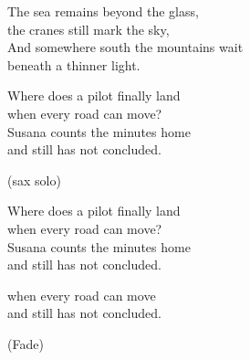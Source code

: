\begin{lyrics}
The sea remains beyond the glass,\\
the cranes still mark the sky,\\
And somewhere south the mountains wait\\
beneath a thinner light.

Where does a pilot finally land\\
when every road can move?\\
Susana counts the minutes home\\
and still has not concluded.

(sax solo)

Where does a pilot finally land\\
when every road can move?\\
Susana counts the minutes home\\
and still has not concluded.

when every road can move\\
and still has not concluded.

(Fade)

\end{lyrics}

